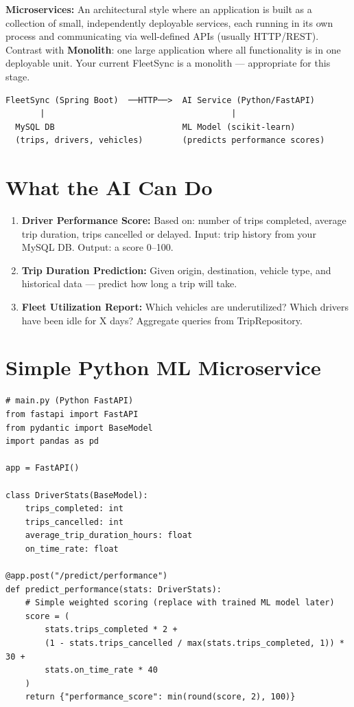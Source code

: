 \documentclass[12pt,a4paper]{report}
\begin{document}
\begin{tcolorbox}[notebox]
\textbf{Microservices:} An architectural style where an application is built as a collection of small, independently deployable services, each running in its own process and communicating via well-defined APIs (usually HTTP/REST). Contrast with \textbf{Monolith}: one large application where all functionality is in one deployable unit. Your current FleetSync is a monolith --- appropriate for this stage.
\end{tcolorbox}

\begin{lstlisting}[style=bashstyle,caption=Phase 2 Architecture]
FleetSync (Spring Boot)  ──HTTP──>  AI Service (Python/FastAPI)
       |                                      |
  MySQL DB                          ML Model (scikit-learn)
  (trips, drivers, vehicles)        (predicts performance scores)
\end{lstlisting}

\section{What the AI Can Do}

\begin{enumerate}
  \item \textbf{Driver Performance Score:} Based on: number of trips completed, average trip duration, trips cancelled or delayed. Input: trip history from your MySQL DB. Output: a score 0--100.
  \item \textbf{Trip Duration Prediction:} Given origin, destination, vehicle type, and historical data --- predict how long a trip will take.
  \item \textbf{Fleet Utilization Report:} Which vehicles are underutilized? Which drivers have been idle for X days? Aggregate queries from TripRepository.
\end{enumerate}

\section{Simple Python ML Microservice}

\begin{lstlisting}[style=bashstyle,caption=Python FastAPI service (Phase 2 - future)]
# main.py (Python FastAPI)
from fastapi import FastAPI
from pydantic import BaseModel
import pandas as pd

app = FastAPI()

class DriverStats(BaseModel):
    trips_completed: int
    trips_cancelled: int
    average_trip_duration_hours: float
    on_time_rate: float

@app.post("/predict/performance")
def predict_performance(stats: DriverStats):
    # Simple weighted scoring (replace with trained ML model later)
    score = (
        stats.trips_completed * 2 +
        (1 - stats.trips_cancelled / max(stats.trips_completed, 1)) * 30 +
        stats.on_time_rate * 40
    )
    return {"performance_score": min(round(score, 2), 100)}
\end{lstlisting}
\end{document}
